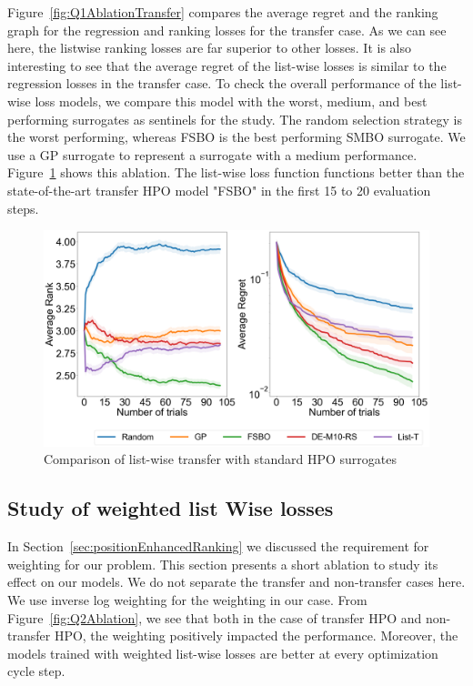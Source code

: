 \documentclass[12pt, twoside, ngerman]{report}
\begin{document}
Figure~\ref{fig:Q1AblationTransfer} compares the average regret and the ranking graph for the regression and ranking losses for the transfer case.
As we can see here,  the listwise ranking losses are far superior to other losses.
It is also interesting to see that the average regret of the list-wise losses is similar to the regression losses in the transfer case.
To check the overall performance of the list-wise loss models, we compare this model with the worst,  medium, and best performing surrogates as sentinels for the study.
The random selection strategy is the worst performing,  whereas FSBO is the best performing SMBO surrogate. We use a GP surrogate to represent a surrogate with a medium performance.
Figure~\ref{fig:Q1FinalAblation} shows this ablation.
The list-wise loss function functions better than the state-of-the-art transfer HPO model "FSBO" in the first 15 to 20 evaluation steps.

\begin{figure}[h]
  \centering
    \includegraphics[scale=0.25]{images/Q1FinalAblation}
    \caption{Comparison of list-wise transfer with standard HPO surrogates}
    \label{fig:Q1FinalAblation}
\end{figure}


\subsection{Study of weighted list Wise losses}

In Section~\ref{sec:positionEnhancedRanking} we discussed the requirement for weighting for our problem.
This section presents a short ablation to study its effect on our models.
We do not separate the transfer and non-transfer cases here.
We use inverse log weighting for the weighting in our case.
From Figure~\ref{fig:Q2Ablation}, we see that both in the case of transfer HPO and non-transfer HPO, the weighting positively impacted the performance. Moreover, the models trained with weighted list-wise losses are better at every optimization cycle step.
\end{document}
